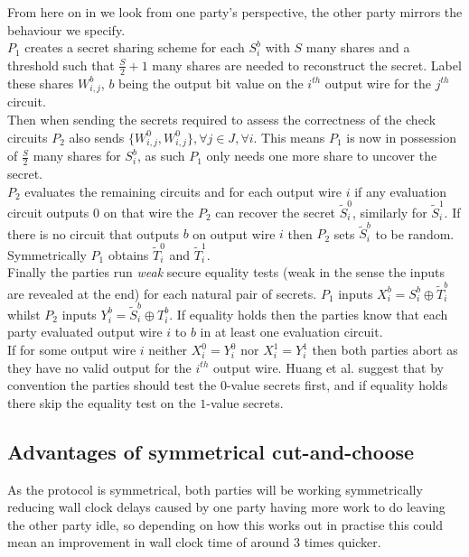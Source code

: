 \documentclass[ %
                    author={Nicholas Tutte},
                supervisor={Prof. Nigel Smart},
                    degree={MEng},
                     title={Secure Two Party Computation},
                  subtitle={A practical comparison of recent protocols},
                      type={Research - GG1K},
                      year={2015} ]{dissertation}
\begin{document}
				From here on in we look from one party's perspective, the other party mirrors the behaviour we specify.\\

				$P_1$ creates a secret sharing scheme for each $S_i^b$ with $S$ many shares and a threshold such that $\frac{S}{2} + 1$ many shares are needed to reconstruct the secret. Label these shares $W_{i, j}^b$, $b$ being the output bit value on the $i^{th}$ output wire for the $j^{th}$ circuit.\\

				Then when sending the secrets required to assess the correctness of the check circuits $P_2$ also sends $\{W_{i, j}^0, W_{i, j}^0\}, \forall j \in J, \forall i$. This means $P_1$ is now in possession of $\frac{S}{2}$ many shares for $S_i^b$, as such $P_1$ only needs one more share to uncover the secret.\\

				$P_2$ evaluates the remaining circuits and for each output wire $i$ if any evaluation circuit outputs $0$ on that wire the $P_2$ can recover the secret $\tilde S_i^0$, similarly for $\tilde S_i^1$. If there is no circuit that outputs $b$ on output wire $i$ then $P_2$ sets $\tilde S_i^b$ to be random. Symmetrically $P_1$ obtains $\tilde T_i^0$ and $\tilde T_i^1$.\\

				Finally the parties run \emph{weak} secure equality tests (weak in the sense the inputs are revealed at the end) for each natural pair of secrets. $P_1$ inputs $X_i^b = S_i^b \oplus \tilde T_i^b$ whilst $P_2$ inputs $Y_i^b = \tilde S_i^b \oplus T_i^b$. If equality holds then the parties know that each party evaluated output wire $i$ to $b$ in at least one evaluation circuit.\\

				If for some output wire $i$ neither $X_i^0 = Y_i^0$ nor $X_i^1 = Y_i^1$ then both parties abort as they have no valid output for the $i^{th}$ output wire. Huang et al. suggest that by convention the parties should test the $0$-value secrets first, and if equality holds there skip the equality test on the $1$-value secrets.\\


			\subsection{Advantages of symmetrical cut-and-choose}
				As the protocol is symmetrical, both parties will be working symmetrically reducing wall clock delays caused by one party having more work to do leaving the other party idle, so depending on how this works out in practise this could mean an improvement in wall clock time of around $3$ times quicker.\\
\end{document}
